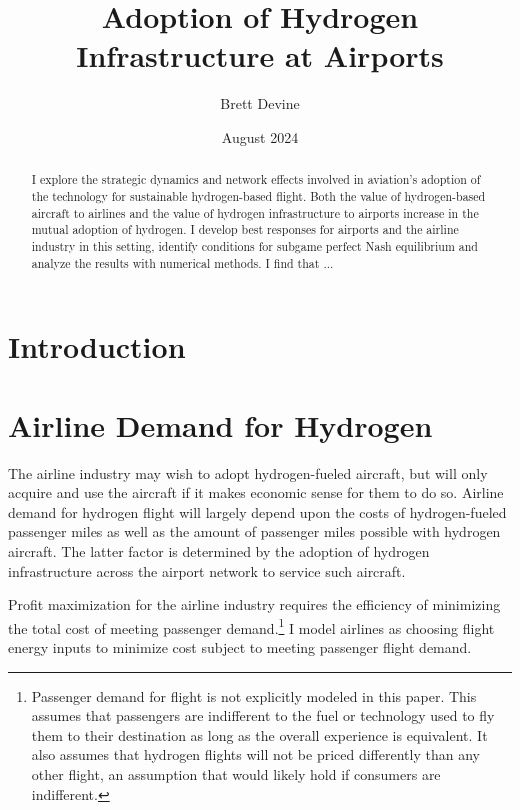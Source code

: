 \documentclass[a4paper, 14pt]{article}
\title{Adoption of Hydrogen Infrastructure at Airports}
\author{Brett Devine}
\date{August 2024}
\begin{document}
\maketitle
\thispagestyle{empty}
\begin{abstract}
    I explore the strategic dynamics and network effects involved in aviation's adoption of the technology for sustainable hydrogen-based flight.
    Both the value of hydrogen-based aircraft to airlines and the value of hydrogen infrastructure to airports increase in the mutual adoption of hydrogen.
    I develop best responses for airports and the airline industry in this setting, identify conditions for subgame perfect Nash equilibrium and analyze the results with numerical methods.
    I find that ...
\end{abstract}


\newpage
\section{Introduction}

\section{Airline Demand for Hydrogen}
\label{sec:airline_demand}

The airline industry may wish to adopt hydrogen-fueled aircraft, but will only acquire and use the aircraft if it makes economic sense for them to do so.
Airline demand for hydrogen flight will largely depend upon the costs of hydrogen-fueled passenger miles as well as the amount of passenger miles possible with hydrogen aircraft.
The latter factor is determined by the adoption of hydrogen infrastructure across the airport network to service such aircraft.

Profit maximization for the airline industry requires the efficiency of minimizing the total cost of meeting passenger demand.\footnote{Passenger demand for flight is not explicitly modeled in this paper. This assumes that passengers are indifferent to the fuel or technology used to fly them to their destination as long as the overall experience is equivalent. It also assumes that hydrogen flights will not be priced differently than any other flight, an assumption that would likely hold if consumers are indifferent.}
I model airlines as choosing flight energy inputs to minimize cost subject to meeting passenger flight demand.
\end{document}

